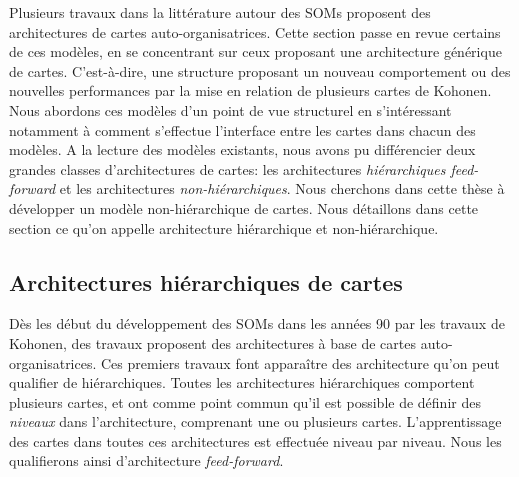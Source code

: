 \documentclass[../main]{subfiles}
\begin{document}
Plusieurs travaux dans la littérature autour des SOMs proposent des architectures de cartes auto-organisatrices.
Cette section passe en revue certains de ces modèles, en se concentrant sur ceux proposant une architecture générique de cartes. C'est-à-dire, une structure proposant un nouveau comportement ou des nouvelles performances par la mise en relation de plusieurs cartes de Kohonen.
Nous abordons ces modèles d'un point de vue structurel en s'intéressant notamment à comment s'effectue l'interface entre les cartes dans chacun des modèles.
A la lecture des modèles existants, nous avons pu différencier deux grandes classes d'architectures de cartes: les architectures \emph{hiérarchiques feed-forward} et  les architectures \emph{non-hiérarchiques}. Nous cherchons dans cette thèse à développer un modèle non-hiérarchique de cartes. Nous détaillons dans cette section ce qu'on appelle architecture hiérarchique et non-hiérarchique.

\subsection{Architectures hiérarchiques de cartes}

Dès les début du développement des SOMs dans les années 90 par les travaux de Kohonen, des travaux proposent des architectures à base de cartes auto-organisatrices. Ces premiers travaux font apparaître des architecture qu'on peut qualifier de hiérarchiques. 
Toutes les architectures hiérarchiques comportent plusieurs cartes, et ont comme point commun qu'il est possible de définir des \emph{niveaux} dans l'architecture, comprenant une ou plusieurs cartes. L'apprentissage des cartes dans toutes ces architectures est effectuée niveau par niveau. Nous les qualifierons ainsi d'architecture \emph{feed-forward}.
\end{document}
